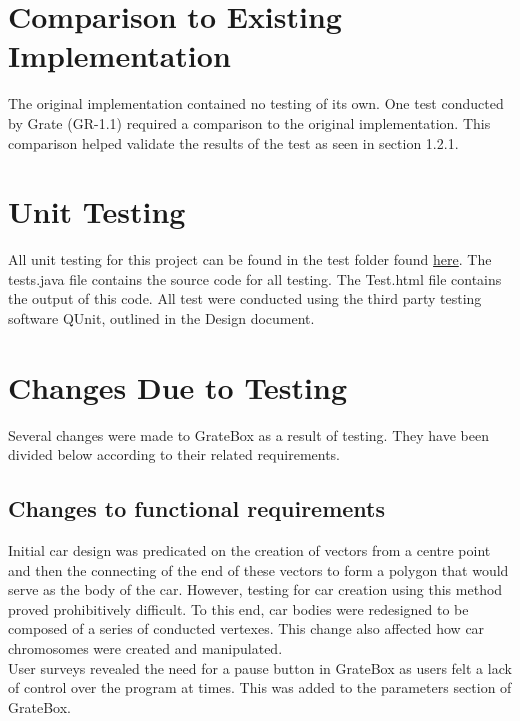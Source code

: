 \documentclass[12pt, titlepage]{article}
\begin{document}
\section{Comparison to Existing Implementation}

The original implementation contained no testing of its own. One test conducted by Grate (GR-1.1) required a comparison to the original implementation. This comparison helped validate the results of the test as seen in section 1.2.1.

\section{Unit Testing}

All unit testing for this project can be found in the test folder found \href{https://gitlab.cas.mcmaster.ca/linkk4/GrateBox/tree/master/src/test}{here}. The tests.java file contains the source code for all testing. The Test.html file contains the output of this code. All test were conducted using the third party testing software QUnit, outlined in the Design document.

\section{Changes Due to Testing}

Several changes were made to GrateBox as a result of testing. They have been divided below according to their related requirements.

\subsection{Changes to functional requirements}

Initial car design was predicated on the creation of vectors from a centre point and then the connecting of the end of these vectors to form a polygon that would serve as the body of the car. However, testing for car creation using this method proved prohibitively difficult. To this end, car bodies were redesigned to be composed of a series of conducted vertexes. This change also affected how car chromosomes were created and manipulated.\\


User surveys revealed the need for a pause button in GrateBox as users felt a lack of control over the program at times. This was added to the parameters section of GrateBox.\\
\end{document}
